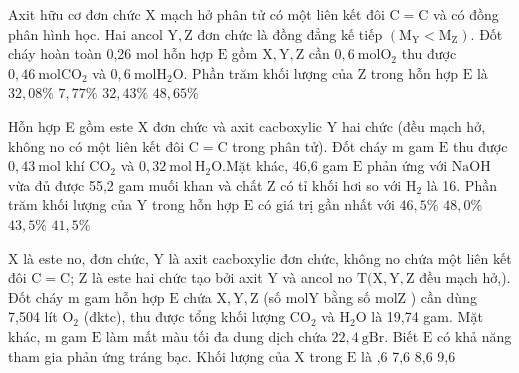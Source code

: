 \begin{vdex}
	Axit hữu cơ đơn chức $\mathrm{X}$ mạch hở phân tử có một liên kết đôi $\mathrm{C}=\mathrm{C}$ và có đồng phân hình học. Hai ancol $\mathrm{Y}, \mathrm{Z}$ đơn chức là đồng đẳng kế tiếp $\left(\mathrm{M}_{\mathrm{Y}}<\mathrm{M}_{\mathrm{Z}}\right)$. Đốt cháy hoàn toàn 0,26 mol hỗn hợp $\mathrm{E}$ gồm $\mathrm{X}, \mathrm{Y}, \mathrm{Z}$ cần $0,6 \mathrm{~mol} \mathrm{O}_2$ thu được $0,46 \mathrm{~mol} \mathrm{CO}_2$ và $0,6 \mathrm{~mol} \mathrm{H}_2 \mathrm{O}$. Phần trăm khối lượng của $\mathrm{Z}$ trong hỗn hợp $\mathrm{E}$ là
	\choice
	{%
		$32,08 \%$
	}
	{%
       \True  $7,77 \%$
	}
	{%
		$32,43 \%$
	}
	{%
		$48,65 \%$
	}
	\huongdan
	{%
		
		
		
	}			
\end{vdex}

\begin{vdex}
Hỗn hợp E gồm este $\mathrm{X}$ đơn chức và axit cacboxylic $\mathrm{Y}$ hai chức (đều mạch hở, không no có một liên kết đôi $\mathrm{C}=\mathrm{C}$ trong phân tử). Đốt cháy $\mathrm{m}$ gam $\mathrm{E}$ thu được $0,43 \mathrm{~mol}$ khí $\mathrm{CO}_2$ và $0,32 \mathrm{~mol}~\mathrm{H}_2 \mathrm{O}$.Mặt khác, 46,6 gam $\mathrm{E}$ phản ứng với $\mathrm{NaOH}$ vừa đủ được 55,2 gam muối khan và chất $\mathrm{Z}$ có tỉ khối hơi so với $\mathrm{H}_2$ là 16. Phần trăm khối lượng của $\mathrm{Y}$ trong hỗn hợp $\mathrm{E}$ có giá trị gần nhất với
	\choice
	{%
		$46,5 \%$
	}
	{%
		$48,0 \%$
	}
	{%
		$43,5 \%$
	}
	{%
	\True	$41,5 \%$
	}
	\huongdan
	{%
		
		
		
	}			
\end{vdex}
\begin{vdex}
	$\mathrm{X}$ là este no, đơn chức, $\mathrm{Y}$ là axit cacboxylic đơn chức, không no chứa một liên kết đôi $\mathrm{C}=\mathrm{C}$; $\mathrm{Z}$ là este hai chức tạo bởi axit $\mathrm{Y}$ và ancol no $\mathrm{T}(\mathrm{X}, \mathrm{Y}, \mathrm{Z}$ đều mạch hở,). Đốt cháy $\mathrm{m}$ gam hỗn hợp $\mathrm{E}$ chứa $\mathrm{X}, \mathrm{Y}, \mathrm{Z}$ (số $\mathrm{mol} \mathrm{Y}$ bằng số $\mathrm{mol} \mathrm{Z}$ ) cần dùng 7,504 lít $\mathrm{O}_2$ (đktc), thu được tổng khối lượng $\mathrm{CO}_2$ và $\mathrm{H}_2 \mathrm{O}$ là 19,74 gam. Mặt khác, $\mathrm{m}$ gam $\mathrm{E}$ làm mất màu tối đa dung dịch chứa $22,4 \mathrm{~g} \mathrm{Br}$. Biết $\mathrm{E}$ có khả năng tham gia phản ứng tráng bạc. Khối lượng của $\mathrm{X}$ trong $\mathrm{E}$ là
	\choice
	{%
	,6
	}
	{%
		7,6
	}
	{%
		8,6
	}
	{%
		9,6
	}
	\huongdan
	{%
		
		
		
	}			
\end{vdex}


